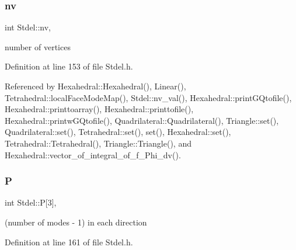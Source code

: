 \mbox{\label{classStdel_a20c0e35541cab4a1f07974659ae7a9ad}} 
\subsubsection{\texorpdfstring{nv}{nv}}
{\footnotesize\ttfamily int Stdel\+::nv\hspace{0.3cm}{\ttfamily [protected]}, {\ttfamily [inherited]}}



number of vertices 



Definition at line 153 of file Stdel.\+h.



Referenced by Hexahedral\+::\+Hexahedral(), Linear(), Tetrahedral\+::local\+Face\+Mode\+Map(), Stdel\+::nv\+\_\+val(), Hexahedral\+::print\+G\+Qtofile(), Hexahedral\+::printtoarray(), Hexahedral\+::printtofile(), Hexahedral\+::printw\+G\+Qtofile(), Quadrilateral\+::\+Quadrilateral(), Triangle\+::set(), Quadrilateral\+::set(), Tetrahedral\+::set(), set(), Hexahedral\+::set(), Tetrahedral\+::\+Tetrahedral(), Triangle\+::\+Triangle(), and Hexahedral\+::vector\+\_\+of\+\_\+integral\+\_\+of\+\_\+f\+\_\+\+Phi\+\_\+dv().

\mbox{\label{classStdel_a05cbb3f2a3fa0bc04a74e347dc6574cf}} 
\subsubsection{\texorpdfstring{P}{P}}
{\footnotesize\ttfamily int Stdel\+::P\mbox{[}3\mbox{]}\hspace{0.3cm}{\ttfamily [protected]}, {\ttfamily [inherited]}}



(number of modes -\/ 1) in each direction 



Definition at line 161 of file Stdel.\+h.



